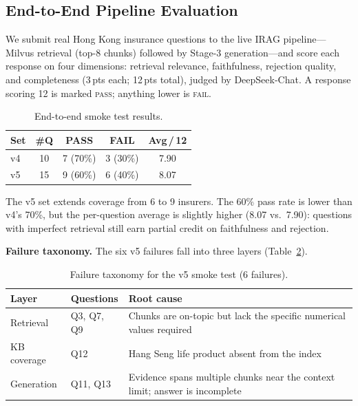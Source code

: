 \subsection{End-to-End Pipeline Evaluation}
\label{sec:e2e}

We submit real Hong Kong insurance questions to the live IRAG
pipeline---Milvus retrieval (top-8 chunks) followed by Stage-3
generation---and score each response on four dimensions: retrieval relevance,
faithfulness, rejection quality, and completeness (3\,pts each; 12\,pts total),
judged by DeepSeek-Chat.
A response scoring 12 is marked \textsc{pass}; anything lower is
\textsc{fail}.

\begin{table}[htbp]
\centering
\caption{End-to-end smoke test results.}
\label{tab:smoke}
\small
\begin{tabular}{@{}lcccc@{}}
\toprule
Set & \#Q & PASS & FAIL & Avg\,/\,12 \\
\midrule
v4 & 10 & 7 (70\%) & 3 (30\%) & 7.90 \\
v5 & 15 & 9 (60\%) & 6 (40\%) & 8.07 \\
\bottomrule
\end{tabular}
\end{table}

The v5 set extends coverage from 6 to 9 insurers.
The 60\% pass rate is lower than v4's 70\%, but the per-question average is
slightly higher (8.07 vs.\ 7.90): questions with imperfect retrieval still earn
partial credit on faithfulness and rejection.

\noindent\textbf{Failure taxonomy.}
The six v5 failures fall into three layers (Table~\ref{tab:failures}).

\begin{table}[htbp]
\centering
\caption{Failure taxonomy for the v5 smoke test (6 failures).}
\label{tab:failures}
\small
\begin{tabular}{@{}p{1.3cm}p{1.2cm}p{4.5cm}@{}}
\toprule
Layer & Questions & Root cause \\
\midrule
Retrieval & Q3, Q7, Q9 & Chunks are on-topic but lack the specific numerical values required \\
KB coverage & Q12 & Hang Seng life product absent from the index \\
Generation & Q11, Q13 & Evidence spans multiple chunks near the context limit; answer is incomplete \\
\bottomrule
\end{tabular}
\end{table}


